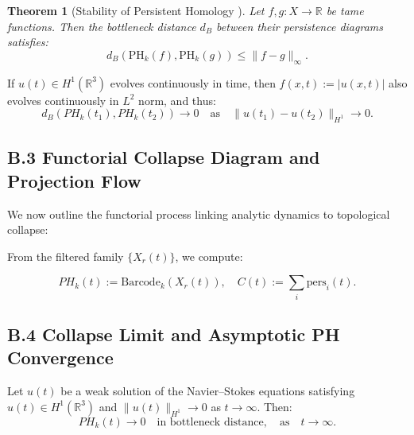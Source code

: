 \documentclass[11pt]{article}
\newtheorem{theorem}{Theorem}[section]
\begin{document}
\begin{theorem}[Stability of Persistent Homology {\cite{CohenSteiner2007}}]
Let $f, g: X \to \mathbb{R}$ be tame functions. Then the bottleneck distance $d_B$ between their persistence diagrams satisfies:
\[
d_B(\mathrm{PH}_k(f), \mathrm{PH}_k(g)) \leq \|f - g\|_\infty.
\]
\end{theorem}

\begin{corollary}
If $u(t) \in H^1(\mathbb{R}^3)$ evolves continuously in time, then $f(x,t) := |u(x,t)|$ also evolves continuously in $L^2$ norm, and thus:
\[
d_B(PH_k(t_1), PH_k(t_2)) \to 0 \quad \text{as} \quad \|u(t_1) - u(t_2)\|_{H^1} \to 0.
\]
\end{corollary}

\subsection*{B.3 Functorial Collapse Diagram and Projection Flow}

We now outline the functorial process linking analytic dynamics to topological collapse:

\begin{center}
\end{center}

From the filtered family $\{X_r(t)\}$, we compute:

\[
PH_k(t) := \mathrm{Barcode}_k(X_r(t)),
\quad C(t) := \sum_i \text{pers}_i(t).
\]

\subsection*{B.4 Collapse Limit and Asymptotic PH Convergence}

\begin{lemma}
Let $u(t)$ be a weak solution of the Navier–Stokes equations satisfying $u(t) \in H^1(\mathbb{R}^3)$ and $\|u(t)\|_{H^1} \to 0$ as $t \to \infty$. Then:
\[
PH_k(t) \to 0 \quad \text{in bottleneck distance}, \quad \text{as} \quad t \to \infty.
\]
\end{lemma}
\end{document}
